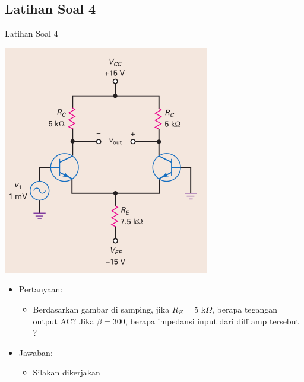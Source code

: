 \documentclass[aspectratio=169]{beamer}
\begin{document}
\subsection{Latihan Soal 4}
\begin{frame}{Latihan Soal 4}
	\begin{multicols}{2}
		\begin{center}
			\includegraphics[height=0.7\textheight]{gambar/01.contoh_soal_1-2}
		\end{center}
		\columnbreak
		\begin{itemize}
			\item Pertanyaan:
			\begin{itemize}
				\item Berdasarkan gambar di samping, jika $ R_E = 5 \text{ k}\Omega $, berapa tegangan output AC? Jika $ \beta = 300 $, berapa impedansi input dari diff amp tersebut ?
			\end{itemize}
			\item Jawaban:
			\begin{itemize}
				\item Silakan dikerjakan
			\end{itemize}
		\end{itemize}
	\end{multicols}
\end{frame}
\end{document}
